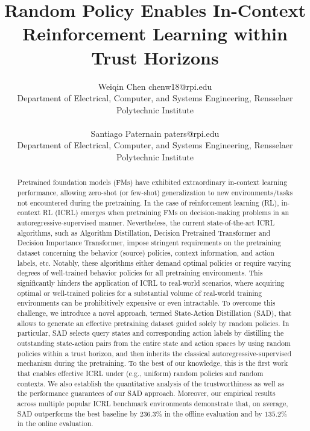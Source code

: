 \documentclass[10pt]{article}
\title{Random Policy Enables In-Context Reinforcement Learning within Trust Horizons}
\author{\name Weiqin Chen \email chenw18@rpi.edu \\
      \addr Department of Electrical, Computer, and Systems Engineering, Rensselaer Polytechnic Institute \\
      \AND
      \\
      \name Santiago Paternain \email paters@rpi.edu \\
      \addr Department of Electrical, Computer, and Systems Engineering, Rensselaer Polytechnic Institute
      }
\begin{document}
\maketitle
\begin{abstract}
Pretrained foundation models (FMs) have exhibited extraordinary in-context learning performance, allowing zero-shot (or few-shot) generalization to new environments/tasks not encountered during the pretraining. In the case of reinforcement learning (RL), in-context RL (ICRL) emerges when pretraining FMs on decision-making problems in an autoregressive-supervised manner. Nevertheless, the current state-of-the-art ICRL algorithms, such as Algorithm Distillation,  Decision Pretrained Transformer and Decision Importance Transformer, impose stringent requirements on the pretraining dataset concerning the behavior (source) policies, context information, and action labels, etc. Notably, these algorithms either demand optimal policies or require varying degrees of well-trained behavior policies for all pretraining environments. This significantly hinders the application of ICRL to real-world scenarios, where acquiring optimal or well-trained policies for a substantial volume of real-world training environments can be prohibitively expensive or even intractable. To overcome this challenge, we introduce a novel approach, termed State-Action Distillation (SAD), that allows to generate an effective pretraining dataset guided solely by random policies. In particular, SAD selects query states and corresponding action labels by distilling the outstanding state-action pairs from the entire state and action spaces by using random policies within a trust horizon, and then inherits the classical autoregressive-supervised mechanism during the pretraining. To the best of our knowledge, this is the first work that enables effective ICRL under (e.g., uniform) random policies and random contexts. We also establish the quantitative analysis of the trustworthiness as well as the performance guarantees of our SAD approach. Moreover, our empirical results across multiple popular ICRL benchmark environments demonstrate that, on average, SAD outperforms the best baseline by $236.3\%$ in the offline evaluation and by $135.2\%$ in the online evaluation.
\end{abstract}
\end{document}
